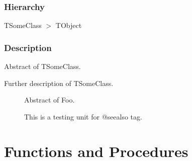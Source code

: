 \documentclass{report}
\begin{document}
\subsubsection*{\large{\textbf{Hierarchy}}\normalsize\hspace{1ex}\hfill}
TSomeClass {$>$} TObject
\subsubsection*{\large{\textbf{Description}}\normalsize\hspace{1ex}\hfill}
Abstract of TSomeClass.\hfill\vspace*{1ex}

 Further description of TSomeClass.  \begin{list}{}{
\setlength{\itemindent}{0cm}
\setlength{\listparindent}{0cm}
\setlength{\leftmargin}{\evensidemargin}
\addtolength{\leftmargin}{\tmplength}
\settowidth{\labelsep}{X}
\addtolength{\leftmargin}{\labelsep}
\setlength{\labelwidth}{\tmplength}
}
\item[\textbf{See also}]
\begin{description}
\item[\begin{ttfamily}Foo\end{ttfamily}(\ref{ok_see_also-Foo})] 
Abstract of Foo.
\item[\begin{ttfamily}ok{\_}see{\_}also unit\end{ttfamily}(\ref{ok_see_also})] 
This is a testing unit for @seealso tag.
\end{description}
\end{list}
\section{Functions and Procedures}
\end{document}
